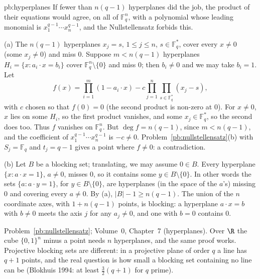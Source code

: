 \begin{solution}{pb:hyperplanes}
\idea If fewer than $n(q-1)$ hyperplanes did the job, the product of their equations would agree, on all of $\mathbb F_q^n$, with
a polynomial whose leading monomial is $x_1^{q-1}\cdots x_n^{q-1}$, and the Nullstellensatz forbids this.

\writeup (a) The $n(q-1)$ hyperplanes $x_j=s$, $1\le j\le n$, $s\in\mathbb F_q^*$, cover every $x\ne0$ (some $x_j\ne0$) and miss $0$.
Suppose $m<n(q-1)$ hyperplanes $H_i=\{x:a_i\cdot x=b_i\}$ cover $\mathbb F_q^n\setminus\{0\}$ and miss $0$; then $b_i\ne0$ and we
may take $b_i=1$. Let
\[
f(x)=\prod_{i=1}^m(1-a_i\cdot x)-c\prod_{j=1}^n\prod_{s\in\mathbb F_q^*}(x_j-s),
\]
with $c$ chosen so that $f(0)=0$ (the second product is non-zero at $0$). For $x\ne0$, $x$ lies on some $H_i$, so the first product
vanishes, and some $x_j\in\mathbb F_q^*$, so the second does too. Thus $f$ vanishes on $\mathbb F_q^n$. But $\deg f=n(q-1)$, since
$m<n(q-1)$, and the coefficient of $x_1^{q-1}\cdots x_n^{q-1}$ is $-c\ne0$. Problem~\ref{pb:nullstellensatz}(b) with $S_j=\mathbb F_q$ and
$t_j=q-1$ gives a point where $f\ne0$: a contradiction.

(b) Let $B$ be a blocking set; translating, we may assume $0\in B$. Every hyperplane $\{x:a\cdot x=1\}$, $a\ne0$, misses $0$, so it
contains some $y\in B\setminus\{0\}$. In other words the sets $\{a:a\cdot y=1\}$, for $y\in B\setminus\{0\}$, are hyperplanes (in the
space of the $a$'s) missing $0$ and covering every $a\ne0$. By (a), $|B|-1\ge n(q-1)$. The union of the $n$ coordinate axes, with
$1+n(q-1)$ points, is blocking: a hyperplane $a\cdot x=b$ with $b\ne0$ meets the axis $j$ for any $a_j\ne0$, and one with $b=0$
contains $0$.

\tools Problem~\ref{pb:nullstellensatz}; Volume~0, Chapter~7 (hyperplanes).
\leads Over $\R$ the cube $\{0,1\}^n$ minus a point needs $n$ hyperplanes, and the same proof works. Projective blocking sets are
different: in a projective plane of order $q$ a line has $q+1$ points, and the real question is how small a blocking set
containing no line can be (Blokhuis 1994: at least $\frac32(q+1)$ for $q$ prime).
\end{solution}

